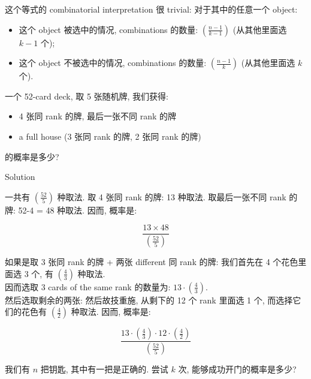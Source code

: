 \documentclass{qlnotes-export}
\begin{document}
这个等式的 combinatorial interpretation 很 trivial: 对于其中的任意一个 object:

\begin{itemize}
\item
  这个 object 被选中的情况, combinations 的数量: \(\left( \frac{n - 1}{k - 1} \right)\) (从其他里面选 \(k - 1\) 个);
\item
  这个 object 不被选中的情况, combinations 的数量: \(\left( \frac{n - 1}{k} \right)\) (从其他里面选 \(k\) 个).
\end{itemize}

\begin{example}

一个 52-card deck, 取 5 张随机牌, 我们获得:

\begin{itemize}
\item
  4 张同 rank 的牌, 最后一张不同 rank 的牌
\item
  a full house (3 张同 rank 的牌, 2 张同 rank 的牌)
\end{itemize}

的概率是多少?

\end{example}

\begin{qlsolution}{Solution}

一共有 \(\left( \frac{52}{5} \right)\) 种取法. 取 4 张同 rank 的牌: 13 种取法. 取最后一张不同 rank 的牌: 52-4 = 48 种取法. 因而, 概率是:

\[\frac{13 \times 48}{\left( \frac{52}{5} \right)}\]

如果是取 3 张同 rank 的牌 + 两张 different 同 rank 的牌: 我们首先在 4 个花色里面选 3 个, 有 \(\left( \frac{4}{3} \right)\) 种取法.\\
因而选取 3 cards of the same rank 的数量为: \(13 \cdot \left( \frac{4}{3} \right)\).\\
然后选取剩余的两张: 然后故技重施, 从剩下的 12 个 rank 里面选 1 个, 而选择它们的花色有 \(\left( \frac{4}{2} \right)\) 种取法. 因而, 概率是:

\[\frac{13 \cdot \left( \frac{4}{3} \right) \cdot 12 \cdot \left( \frac{4}{2} \right)}{\left( \frac{52}{5} \right)}\]

\end{qlsolution}

\begin{example}

我们有 \(n\) 把钥匙, 其中有一把是正确的. 尝试 \(k\) 次, 能够成功开门的概率是多少?

\end{example}
\end{document}
